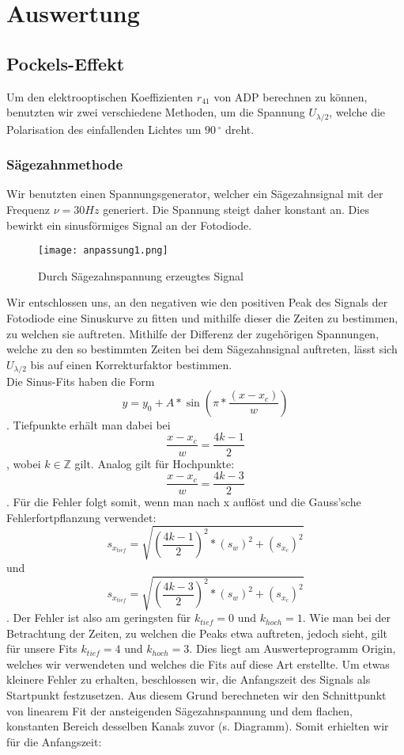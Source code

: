\clearpage
\section{Auswertung}
\subsection{Pockels-Effekt}
Um den elektrooptischen Koeffizienten $r_{41}$ von ADP berechnen zu können, benutzten wir zwei verschiedene Methoden, um die Spannung $U_{\lambda/2}$, welche die Polarisation des einfallenden Lichtes um $90\,^{\circ}$ dreht.\\
\subsubsection{Sägezahnmethode}
Wir benutzten einen Spannungsgenerator, welcher ein Sägezahnsignal mit der Frequenz $\nu=30 Hz$ generiert. Die Spannung steigt daher konstant an. Dies bewirkt ein sinusförmiges Signal an der Fotodiode. \\
\begin{figure}[h]
\begin{center}
\texttt{[image: anpassung1.png]}
\caption{Durch Sägezahnspannung erzeugtes Signal}
\end{center}
\end{figure}
\clearpage
Wir entschlossen uns, an den negativen wie den positiven Peak des Signals der Fotodiode eine Sinuskurve zu fitten und mithilfe dieser die Zeiten zu bestimmen, zu welchen sie auftreten. Mithilfe der Differenz der zugehörigen Spannungen, welche zu den so bestimmten Zeiten bei dem Sägezahnsignal auftreten, lässt sich $U_{\lambda/2}$ bis auf einen Korrekturfaktor bestimmen. \\
Die Sinus-Fits haben die Form \[y=y_{0}+A*\sin(\pi*\frac{(x-x_{c})}{w})\]. Tiefpunkte erhält man dabei bei \[\frac{x-x_{c}}{w}=\frac{4k-1}{2}\], wobei $k\in \mathbb{Z}$ gilt. Analog gilt für Hochpunkte: \[\frac{x-x_{c}}{w}=\frac{4k-3}{2}\]. Für die Fehler folgt somit, wenn man nach x auflöst und die Gauss'sche Fehlerfortpflanzung verwendet: \[s_{x_{tief}}=\sqrt{(\frac{4k-1}{2})^{2}*(s_{w})^{2}+(s_{x_{c}})^{2}}\] und \[s_{x_{tief}}=\sqrt{(\frac{4k-3}{2})^{2}*(s_{w})^{2}+(s_{x_{c}})^{2}}\]. Der Fehler ist also am geringsten für $k_{tief}=0$ und $k_{hoch}=1$. Wie man bei der Betrachtung der Zeiten, zu welchen die Peaks etwa auftreten, jedoch sieht, gilt für unsere Fits $k_{tief}=4$ und $k_{hoch}=3$. Dies liegt am Auswerteprogramm Origin, welches wir verwendeten und welches die Fits auf diese Art erstellte. Um etwas kleinere Fehler zu erhalten, beschlossen wir, die Anfangszeit des Signals als Startpunkt festzusetzen. Aus diesem Grund berechneten wir den Schnittpunkt von linearem Fit der ansteigenden Sägezahnspannung und dem flachen, konstanten Bereich desselben Kanals zuvor (s. Diagramm). Somit erhielten wir für die Anfangszeit:\\
